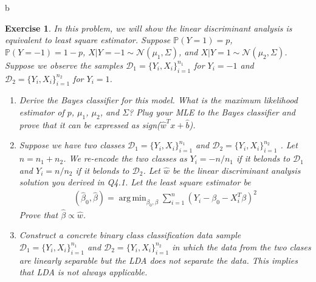 \documentclass[12pt]{article}
\DeclareMathOperator*{\argmin}{arg\,min}
\theoremstyle{colon}
\newtheorem{exercise}{Exercise}
\begin{document}
\clearpage
b
\begin{exercise}
  In this problem, we will show the linear discriminant analysis is equivalent to least square estimator. Suppose $\mathbb{P}(Y = 1) = p$, $\mathbb{P}(Y = -1) = 1 - p$, $X | Y = -1 \sim \mathcal{N}(\mu_1, \Sigma)$, and $X | Y = 1 \sim \mathcal{N}(\mu_2, \Sigma)$. Suppose we observe the samples $\mathcal{D}_1 = \{ Y_i, X_i \}_{i=1}^{n_1}$ for $Y_i = -1$ and $\mathcal{D}_2 = \{ Y_i, X_i \}_{i=1}^{n_2}$ for $Y_i = 1$.
  \begin{enumerate}[label=\arabic*)]
    \item Derive the Bayes classifier for this model. What is the maximum likelihood estimator of $p$, $\mu_1$, $\mu_2$, and $\Sigma$? Plug your MLE to the Bayes classifier and prove that it can be expressed as sign($\hat{w}^T x + \hat{b}$).

    \item Suppose we have two classes $\mathcal{D}_1 = \{ Y_i, X_i \}_{i=1}^{n_1}$ and $\mathcal{D}_2 = \{ Y_i, X_i \}_{i=1}^{n_2}$ . Let $n = n_1 + n_2$. We re-encode the two classes as $Y_i = -n/n_1$ if it belonds to $\mathcal{D}_1$ and $Y_i = n/n_2$ if it belonds to $\mathcal{D}_2$. Let $\hat{w}$ be the linear discriminant analysis solution you derived in Q4.1. Let the least square estimator be
      \begin{gather*}
        (\hat{\beta}_0, \hat{\beta}) = \argmin_{\beta_0, \beta} \sum_{i=1}^n (Y_i - \beta_0 - X_i^T \beta)^2
      \end{gather*}
      Prove that $\hat{\beta} \propto \hat{w}$.

    \item Construct a concrete binary class classification data sample \\ $\mathcal{D}_1 = \{ Y_i, X_i \}_{i=1}^{n_1}$ and $\mathcal{D}_2 = \{ Y_i, X_i \}_{i=1}^{n_2}$  in which the data from the two clases are linearly separable but the LDA does not separate the data. This implies that LDA is not always applicable.
  \end{enumerate}
\end{exercise}
\end{document}
